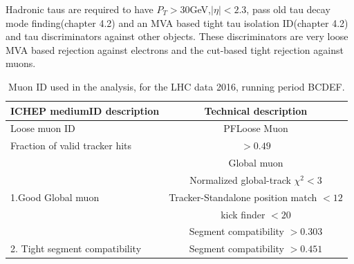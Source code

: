 Hadronic taus are required to have $P_T>30$GeV,$|\eta|<2.3$, pass old tau decay mode finding(chapter 4.2) and an MVA based tight tau isolation ID(chapter 4.2) and tau discriminators against other objects. These discriminators are very loose MVA based rejection against electrons and the cut-based tight rejection against muons.  


\begin{table}[tpb]
\caption{Muon ID used in the analysis, for the LHC data 2016, running period BCDEF.  \label{tbl:ICHEPMedID}}
\label{tab:antil}
\begin{center}
\begin{tabular}{|l|c|}   
\hline
ICHEP mediumID description                    &  Technical description\\\hline
Loose muon ID                               & PFLoose Muon\\\hline
Fraction of valid tracker hits           & $>0.49$ \\\hline
\multirow{5}{*}{1.Good Global muon}                      &Global muon\\\cline{2-2}
                                                                        &Normalized global-track $\chi^{2}<3$\\\cline{2-2}
                                                                        &Tracker-Standalone position match $< 12$\\\cline{2-2}
                                                                        &kick finder $< 20$ \\\cline{2-2}
                                                                        &Segment compatibility $> 0.303$ \\\hline                                                                       
\hline
2. Tight segment compatibility      & Segment compatibility $>0.451$\\\hline
\end{tabular}
\end{center}
\end{table}



